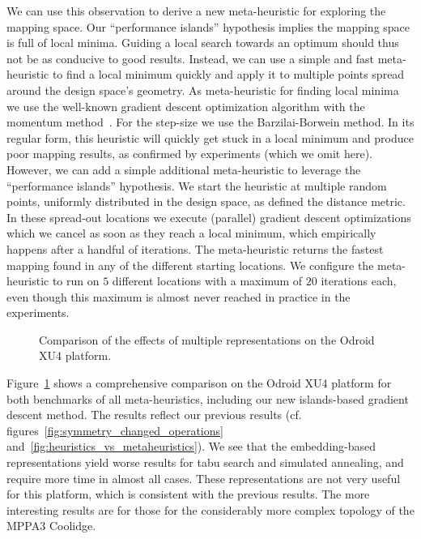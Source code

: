 We can use this observation to derive a new meta-heuristic for exploring the mapping space.
Our ``performance islands'' hypothesis implies the mapping space is full of local minima.
Guiding a local search towards an optimum should thus not be as conducive to good results.
Instead, we can use a simple and fast meta-heuristic to find a local minimum quickly and apply it to multiple points spread around the design space's geometry. 
As meta-heuristic for finding local minima we use the well-known gradient descent optimization algorithm with the momentum method~\cite{rumelhart1986learning}.
For the step-size we use the Barzilai-Borwein \cite{barzilai1988two} method.
In its regular form, this heuristic will quickly get stuck in a local minimum and produce poor mapping results, as confirmed by experiments (which we omit here).
However, we can add a simple additional meta-heuristic to leverage the ``performance islands'' hypothesis.
We start the heuristic at multiple random points, uniformly distributed in the design space, as defined the distance metric.
In these spread-out locations we execute (parallel) gradient descent optimizations which we cancel as soon as they reach a local minimum, which empirically happens after a handful of iterations.
The meta-heuristic returns the fastest mapping found in any of the different starting locations.
We configure the meta-heuristic to run on $5$ different locations with a maximum of $20$ iterations each, even though this maximum is almost never reached in practice in the experiments.

\begin{figure}[h]
	\centering
   \resizebox{0.95\textwidth}{!}{}
	\caption{Comparison of the effects of multiple representations on the Odroid XU4 platform.}
	\label{fig:multiple_representations_exynos}
\end{figure}

Figure~\ref{fig:multiple_representations_exynos} shows a comprehensive comparison on the Odroid XU4 platform for both benchmarks of all meta-heuristics, including our new islands-based gradient descent method. 
The results reflect our previous results (cf. figures~\ref{fig:symmetry_changed_operations} and~\ref{fig:heuristics_vs_metaheuristics}).
We see that the embedding-based representations yield worse results for tabu search and simulated annealing, and require more time in almost all cases.
These representations are not very useful for this platform, which is consistent with the previous results.
The more interesting results are for those for the considerably more complex topology of the MPPA3 Coolidge.

